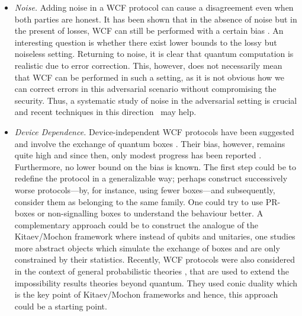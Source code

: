 \documentclass{article}
\begin{document}
\begin{itemize}
  \item \emph{Noise.} Adding noise in a WCF protocol
        can cause a disagreement even when both parties are honest. It has
        been shown that in the absence of noise but in the present of losses, WCF can still be
        performed with a certain bias \cite{Berlin2009}. An interesting
        question is whether there exist lower bounds to the lossy but noiseless setting.
        Returning to noise, it is clear that quantum computation is realistic due to
        error correction.
        This, however, does not necessarily mean that WCF can be performed
        in such a setting, as it is not obvious how we can correct errors
        in this adversarial scenario without compromising the
        security. Thus, a systematic study of noise in the adversarial setting is crucial and recent techniques in this direction~\cite{Gutoski2018} may help.
  \item \emph{Device Dependence.} Device-independent WCF protocols have been suggested and involve the exchange
        of quantum boxes \cite{Aharon2014}.
        Their bias, however, remains quite high and since then, only modest progress has been reported \cite{ASH24}. Furthermore, no lower bound on the bias is known. The first step could
        be to redefine the protocol in a generalizable way; perhaps construct
        successively worse protocols---by, for instance, using fewer boxes---and subsequently, consider them as belonging to the same family.
        One could try to use PR-boxes or non-signalling
        boxes to understand the behaviour better. A complementary approach
        could be to construct the analogue of the Kitaev/Mochon framework
        where instead of qubits and unitaries, one studies more abstract
        objects which simulate the exchange of boxes and are only constrained
        by their statistics. Recently, WCF protocols were also considered in the context of  general probabilistic theories \cite{Sikora2019}, that are used to
        extend the impossibility results theories beyond quantum. They used
        conic duality which is the key point of Kitaev/Mochon frameworks and hence, this approach could be a starting
        point.
\end{itemize}
\end{document}
